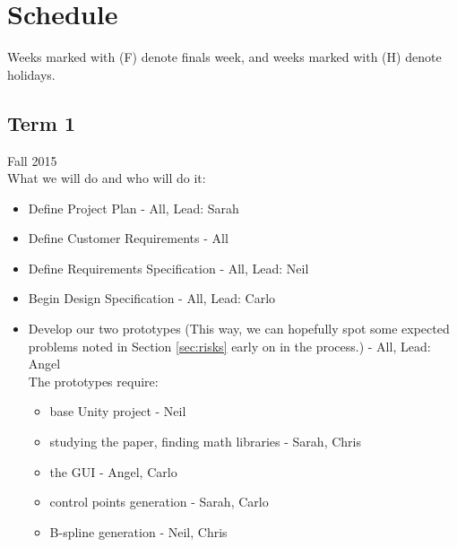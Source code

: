 \section{Schedule}
\label{sec:schedule}
Weeks marked with (F) denote finals week, and weeks marked with (H) denote holidays.

\subsection{Term 1}
Fall 2015 \\
What we will do and who will do it:
\begin{itemize}
	\item Define Project Plan - All, Lead: Sarah
	\item Define Customer Requirements - All
	\item Define Requirements Specification - All, Lead: Neil
	\item Begin Design Specification - All, Lead: Carlo
	\item Develop our two prototypes (This way, we can hopefully spot some expected problems noted in Section \ref{sec:risks} early on in the process.) - All, Lead: Angel \\
	The prototypes require:
	\begin{itemize} 
		\item base Unity project - Neil
		\item studying the paper, finding math libraries - Sarah, Chris
		\item the GUI - Angel, Carlo
		\item control points generation - Sarah, Carlo
		\item B-spline generation - Neil, Chris
	\end{itemize}
\end{itemize}

